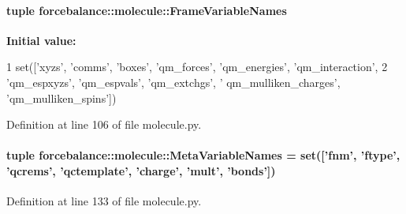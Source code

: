 \hypertarget{namespaceforcebalance_1_1molecule_a03da3fd451a69301311b20f00e409f3a}{
\paragraph[{\-Frame\-Variable\-Names}]{\setlength{\rightskip}{0pt plus 5cm}tuple {\bf forcebalance\-::molecule\-::\-Frame\-Variable\-Names}}}\label{namespaceforcebalance_1_1molecule_a03da3fd451a69301311b20f00e409f3a}
{\bfseries \-Initial value\-:}
\begin{DoxyCode}
1 set(['xyzs', 'comms', 'boxes', 'qm_forces', 'qm_energies', 'qm_interaction', 
2                           'qm_espxyzs', 'qm_espvals', 'qm_extchgs', '
      qm_mulliken_charges', 'qm_mulliken_spins'])
\end{DoxyCode}


\-Definition at line 106 of file molecule.\-py.

\hypertarget{namespaceforcebalance_1_1molecule_a576677e3e9a7d9d1aac5523aaf9098c1}{
\paragraph[{\-Meta\-Variable\-Names}]{\setlength{\rightskip}{0pt plus 5cm}tuple {\bf forcebalance\-::molecule\-::\-Meta\-Variable\-Names} = set(\mbox{[}'fnm', 'ftype', 'qcrems', 'qctemplate', 'charge', 'mult', 'bonds'\mbox{]})}}\label{namespaceforcebalance_1_1molecule_a576677e3e9a7d9d1aac5523aaf9098c1}


\-Definition at line 133 of file molecule.\-py.

